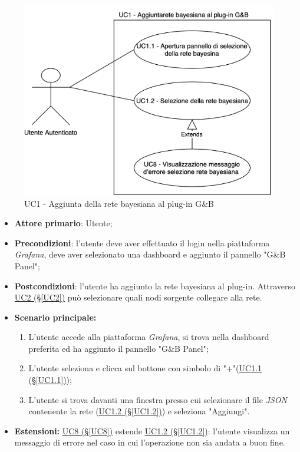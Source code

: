 \begin{figure}[H]
	\begin{center}
		\includegraphics[scale=0.4]{./images/UC1.png}
		 \caption{UC1 - Aggiunta della rete bayesiana al plug-in G\&B}	
	\end{center}
\end{figure}
\begin{itemize}
	\item \textbf{Attore primario}: Utente;
	\item \textbf{Precondizioni}: l'utente deve aver effettuato il login nella piattaforma \textit{Grafana}, deve aver selezionato una dashboard e aggiunto il pannello "G\&B Panel";
	\item \textbf{Postcondizioni}: l'utente ha aggiunto la rete bayesiana al plug-in. Attraverso \hyperref[UC2]{UC2 (§\ref*{UC2})} può selezionare quali nodi sorgente collegare alla rete.
	\item \textbf{Scenario principale:}
	\begin{enumerate}
		\item L'utente accede alla piattaforma \textit{Grafana}, si trova nella dashboard preferita ed ha aggiunto il pannello "G\&B Panel";
		\item L'utente seleziona e clicca sul bottone con simbolo di "+"(\hyperref[UC1.1]{UC1.1 (§\ref*{UC1.1})});
		\item L'utente si trova davanti una finestra presso cui selezionare il file \textit{JSON} contenente la rete (\hyperref[UC1.2]{UC1.2 (§\ref*{UC1.2})}) e seleziona "Aggiungi".
	\end{enumerate}
	\item \textbf{Estensioni:} \hyperref[UC8]{UC8 (§\ref*{UC8})} estende \hyperref[UC1.2]{UC1.2 (§\ref*{UC1.2})}: l'utente visualizza un messaggio di errore nel caso in cui l'operazione non sia andata a buon fine.
\end{itemize}


